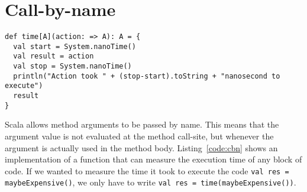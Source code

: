 \section{Call-by-name}

\begin{lstlisting}[caption=Call-by-name, label=code:cbn, escapechar=|, float, floatplacement=H]
def time[A](action: => A): A = {
  val start = System.nanoTime()
  val result = action
  val stop = System.nanoTime()
  println("Action took " + (stop-start).toString + "nanosecond to execute")
  result
}
\end{lstlisting}

Scala allows method arguments to be passed by name.
This means that the argument value is not evaluated at the method call-site, but whenever the argument is actually used in the method body.
Listing~\ref{code:cbn} shows an implementation of a function that can measure the execution time of any block of code.
If we wanted to measure the time it took to execute the code \lstinline|val res = maybeExpensive()|, we only have to write \lstinline|val res = time(maybeExpensive())|.
